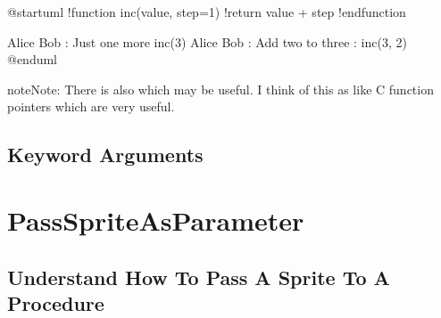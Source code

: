 \documentclass[letterpaper,10pt,english]{sphinxmanual}
\begin{document}
%
\begin{sphinxVerbatim}[commandchars=\\\{\},numbers=left,firstnumber=1,stepnumber=1]
@startuml
!function \PYGZdl{}inc(\PYGZdl{}value, \PYGZdl{}step=1)
!return \PYGZdl{}value + \PYGZdl{}step
!endfunction

Alice \PYGZhy{}\PYGZgt{} Bob : Just one more \PYGZdl{}inc(3)
Alice \PYGZhy{}\PYGZgt{} Bob : Add two to three : \PYGZdl{}inc(3, 2)
@enduml
\end{sphinxVerbatim}
\sphinxresetverbatimhllines

\begin{sphinxadmonition}{note}{Note:}
There is also  which may be useful.
I think of this as like C function pointers which are very useful.
\end{sphinxadmonition}


\subsection{Keyword Arguments}
\label{\detokenize{procedures/procedures:keyword-arguments}}


\section{PassSpriteAsParameter}
\label{\detokenize{PassSpriteAsParameter/PassSpriteAsParameter:passspriteasparameter}}\label{\detokenize{PassSpriteAsParameter/PassSpriteAsParameter::doc}}

\subsection{Understand How To Pass A Sprite To A Procedure}
\label{\detokenize{PassSpriteAsParameter/PassSpriteAsParameter:understand-how-to-pass-a-sprite-to-a-procedure}}
\begin{figure}[htbp]
\centering
\capstart

\caption{}\label{\detokenize{PassSpriteAsParameter/PassSpriteAsParameter:id5}}\end{figure}
\end{document}
